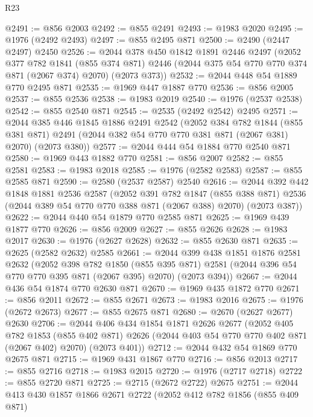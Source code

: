 \begin{lexlean}{R23}
\begin{coremodule}
@2491 := @856 @2003
@2492 := @855 @2491
@2493 := @1983 @2020
@2495 := @1976 (@2492 @2493)
@2497 := @855 @2495 @871
@2500 := @2490 (@2447 @2497) @2450
@2526 := @2044
    @378
    @450
    @1842
    @1891
    @2446
    @2497
    (@2052
      @377
      @782
      @1841
      (@855 @374 @871)
      @2446
      (@2044 @375 @54 @770 @770 @374 @871 (@2067 @374) @2070)
      (@2073 @373))
@2532 := @2044 @448 @54 @1889 @770 @2495 @871
@2535 := @1969 @447 @1887 @770
@2536 := @856 @2005
@2537 := @855 @2536
@2538 := @1983 @2019
@2540 := @1976 (@2537 @2538)
@2542 := @855 @2540 @871
@2545 := @2535 (@2492 @2542) @2495
@2571 := @2044
    @385
    @446
    @1845
    @1886
    @2491
    @2542
    (@2052
      @384
      @782
      @1844
      (@855 @381 @871)
      @2491
      (@2044 @382 @54 @770 @770 @381 @871 (@2067 @381) @2070)
      (@2073 @380))
@2577 := @2044 @444 @54 @1884 @770 @2540 @871
@2580 := @1969 @443 @1882 @770
@2581 := @856 @2007
@2582 := @855 @2581
@2583 := @1983 @2018
@2585 := @1976 (@2582 @2583)
@2587 := @855 @2585 @871
@2590 := @2580 (@2537 @2587) @2540
@2616 := @2044
    @392
    @442
    @1848
    @1881
    @2536
    @2587
    (@2052
      @391
      @782
      @1847
      (@855 @388 @871)
      @2536
      (@2044 @389 @54 @770 @770 @388 @871 (@2067 @388) @2070)
      (@2073 @387))
@2622 := @2044 @440 @54 @1879 @770 @2585 @871
@2625 := @1969 @439 @1877 @770
@2626 := @856 @2009
@2627 := @855 @2626
@2628 := @1983 @2017
@2630 := @1976 (@2627 @2628)
@2632 := @855 @2630 @871
@2635 := @2625 (@2582 @2632) @2585
@2661 := @2044
    @399
    @438
    @1851
    @1876
    @2581
    @2632
    (@2052
      @398
      @782
      @1850
      (@855 @395 @871)
      @2581
      (@2044 @396 @54 @770 @770 @395 @871 (@2067 @395) @2070)
      (@2073 @394))
@2667 := @2044 @436 @54 @1874 @770 @2630 @871
@2670 := @1969 @435 @1872 @770
@2671 := @856 @2011
@2672 := @855 @2671
@2673 := @1983 @2016
@2675 := @1976 (@2672 @2673)
@2677 := @855 @2675 @871
@2680 := @2670 (@2627 @2677) @2630
@2706 := @2044
    @406
    @434
    @1854
    @1871
    @2626
    @2677
    (@2052
      @405
      @782
      @1853
      (@855 @402 @871)
      @2626
      (@2044 @403 @54 @770 @770 @402 @871 (@2067 @402) @2070)
      (@2073 @401))
@2712 := @2044 @432 @54 @1869 @770 @2675 @871
@2715 := @1969 @431 @1867 @770
@2716 := @856 @2013
@2717 := @855 @2716
@2718 := @1983 @2015
@2720 := @1976 (@2717 @2718)
@2722 := @855 @2720 @871
@2725 := @2715 (@2672 @2722) @2675
@2751 := @2044
    @413
    @430
    @1857
    @1866
    @2671
    @2722
    (@2052
      @412
      @782
      @1856
      (@855 @409 @871)

\end{coremodule}
\end{lexlean}
